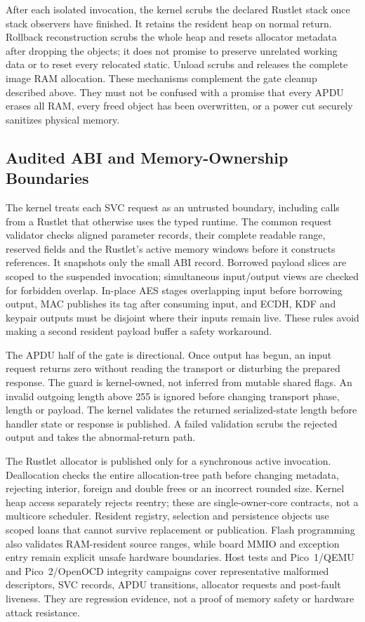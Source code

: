 After each isolated invocation, the kernel scrubs the declared Rustlet stack
once stack observers have finished. It retains the resident heap on normal
return. Rollback reconstruction scrubs the whole heap and resets allocator
metadata after dropping the objects; it does not promise to preserve unrelated
working data or to reset every relocated static. Unload scrubs and releases
the complete image RAM allocation. These mechanisms complement the gate
cleanup described above. They must not be confused with a promise that every
APDU erases all RAM, every freed object has been overwritten, or a power cut
securely sanitizes physical memory.

\subsection{Audited ABI and Memory-Ownership Boundaries}

The kernel treats each SVC request as an untrusted boundary, including calls
from a Rustlet that otherwise uses the typed runtime. The common request
validator checks aligned parameter records, their complete readable range,
reserved fields and the Rustlet's active memory windows before it constructs
references. It snapshots only the small ABI record. Borrowed payload slices
are scoped to the suspended invocation; simultaneous input/output views are
checked for forbidden overlap. In-place AES stages overlapping input before
borrowing output, MAC publishes its tag after consuming input, and ECDH, KDF
and keypair outputs must be disjoint where their inputs remain live. These
rules avoid making a second resident payload buffer a safety workaround.

The APDU half of the gate is directional. Once output has begun, an input
request returns zero without reading the transport or disturbing the prepared
response. The guard is kernel-owned, not inferred from mutable shared flags.
An invalid outgoing length above 255 is ignored before changing transport
phase, length or payload. The kernel validates the returned serialized-state
length before handler state or response is published. A failed validation
scrubs the rejected output and takes the abnormal-return path.

The Rustlet allocator is published only for a synchronous active invocation.
Deallocation checks the entire allocation-tree path before changing metadata,
rejecting interior, foreign and double frees or an incorrect rounded size.
Kernel heap access separately rejects reentry; these are single-owner-core
contracts, not a multicore scheduler. Resident registry, selection and
persistence objects use scoped loans that cannot survive replacement or
publication. Flash programming also validates RAM-resident source ranges,
while board MMIO and exception entry remain explicit unsafe hardware
boundaries. Host tests and Pico~1/QEMU and Pico~2/OpenOCD integrity campaigns
cover representative malformed descriptors, SVC records, APDU transitions,
allocator requests and post-fault liveness. They are regression evidence, not
a proof of memory safety or hardware attack resistance.

